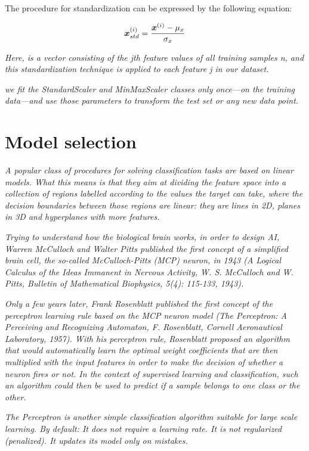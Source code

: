 The procedure for standardization can be expressed by the following equation:

\begin{equation} \label{eq:standardization}
    \boldsymbol{x}^{(i)}_{std} = \frac{\boldsymbol{x}^{(i)} - \mu_x}{\sigma_x}
\end{equation}

\textit{Here,  is a vector consisting of the jth feature values of all training samples n, and this standardization technique is applied to each feature j in our dataset.}

\textit{we fit the StandardScaler and MinMaxScaler classes only once—on the training data—and use those parameters to transform the test set or any new data point.}

\section{Model selection} \label{sec:model_selection}

\textit{A popular class of procedures for solving classification tasks are based on linear models. What this means is that they aim at dividing the feature space into a collection of regions labelled according to the values the target can take, where the decision boundaries between those regions are linear: they are lines in 2D, planes in 3D and hyperplanes with more features.}

\textit{Trying to understand how the biological brain works, in order to design AI, Warren McCulloch and Walter Pitts published the first concept of a simplified brain cell, the so-called McCulloch-Pitts (MCP) neuron, in 1943 (A Logical Calculus of the Ideas Immanent in Nervous Activity, W. S. McCulloch and W. Pitts, Bulletin of Mathematical Biophysics, 5(4): 115-133, 1943).}

\textit{Only a few years later, Frank Rosenblatt published the first concept of the perceptron learning rule based on the MCP neuron model (The Perceptron: A Perceiving and Recognizing Automaton, F. Rosenblatt, Cornell Aeronautical Laboratory, 1957). With his perceptron rule, Rosenblatt proposed an algorithm that would automatically learn the optimal weight coefficients that are then multiplied with the input features in order to make the decision of whether a neuron fires or not. In the context of supervised learning and classification, such an algorithm could then be used to predict if a sample belongs to one class or the other.}

\textit{The Perceptron is another simple classification algorithm suitable for large scale learning. By default: It does not require a learning rate. It is not regularized (penalized). It updates its model only on mistakes.}

